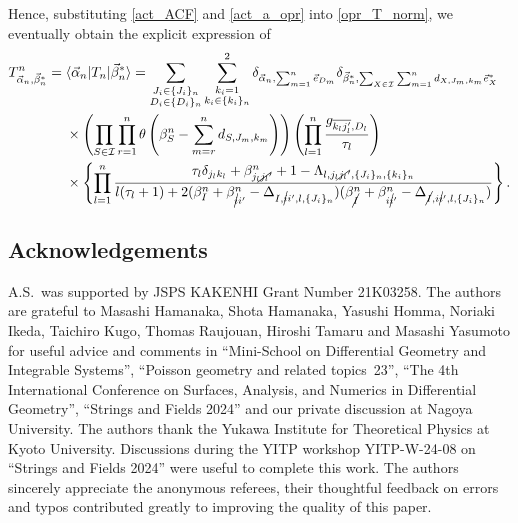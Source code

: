\documentclass[pdftex]{sigma}
\numberwithin{equation}{section}
\begin{document}
Hence, substituting \eqref{act_ACF} and \eqref{act_a_opr} into \eqref{opr_T_norm}, we eventually obtain the explicit expression of~
\begin{align*}%
 T^{n}_{\vec{\alpha}_{n},\vec{\beta}_{n}^{\ast}}
 ={}&
\langle
 \vec{\alpha}_{n}
|
 T_{n}
|
 \vec{\beta}_{n}^{\ast}
\rangle
 =
 \sum_{
 \substack{
 J_{i}
 \in
 \{J_{i}\}_{n}
 \\
 D_{i}
 \in
 \{D_{i}\}_{n}
 }
 }
 \sum_{
 \substack{
 k_{i}
 =
 1
 \\
 k_{i}
 \in
 \{k_{i}\}_{n}
 }
 }^{2}
 \delta_{
 \vec{\alpha}_{n},
 \sum_{m=1}^{n}
 \vec{e}_{D_{m}}
 }
 \delta_{
 \vec{\beta}_{n}^{\ast},
 \sum_{
 X
 \in
 \mathcal{I}
 }
 \sum_{m=1}^{n}
 d_{
 X,
 J_{m},
 k_{m}
 }
 \vec{e}_{X}^{\ast}
 }
 \nonumber
 \\
 &
 \times
 \left(
 \prod_{
 S
 \in
 \mathcal{I}
 }
 \prod_{r=1}^{n}
 \theta
 \left(
 \beta_{S}^{n}
 -
 \sum_{m=r}^{n}
 d_{
 S,
 J_{m},
 k_{m}
 }
 \right)
 \right)
 \left(
 \prod_{l=1}^{n}
 \frac{g_{\overline{k_{l}j_{l}'},D_{l}}}{\tau_{l}}
 \right)
 \\
 &
 \times
 \left\{
 \prod_{l=1}^{n}
 \frac{
 \tau_{l}
 \delta_{j_{l}k_{l}}
 +
 \beta_{j_{l}\cancel{j_{l}}'}^{n}
 +
 1
 -
 \Lambda_{
 l,
 j_{l}\cancel{j_{l}}',
 \{
 J_{i}
 \}_{n},
 \{
 k_{i}
 \}_{n}
 }
 }{
 l
 (
 \tau_{l}+1
 )
 +
 2
 (
 \beta_{I}^{n}
 +
 \beta_{\cancel{i}i'}^{n}
 -
 \Delta_{
 I,
 \cancel{i}i',
 l,
 \{
 J_{i}
 \}_{n}
 }
 )
 (
 \beta_{\cancel{I}}^{n}
 +
 \beta_{i\cancel{i}'}^{n}
 -
 \Delta_{
 \cancel{I},
 i\cancel{i}',
 l,
 \{
 J_{i}
 \}_{n}
 }
 )
 }
 \right\}
 .
\end{align*}

\subsection*{Acknowledgements}

A.S.\ was supported by JSPS KAKENHI Grant Number 21K03258. The authors are grateful to Masashi Hamanaka, Shota Hamanaka, Yasushi Homma, Noriaki Ikeda, Taichiro Kugo, Thomas Raujouan, Hiroshi Tamaru and Masashi Yasumoto for useful advice and comments in ``Mini-School on Differential Geometry and Integrable Systems'', ``Poisson geometry and related topics~23'', ``The 4th International Conference on Surfaces, Analysis, and Numerics in Differential Geometry'', ``Strings and Fields 2024'' and our private discussion at Nagoya University. The authors thank the Yukawa Institute for Theoretical Physics at Kyoto University. Discussions during the YITP workshop YITP-W-24-08 on ``Strings and Fields 2024'' were useful to complete this work. The authors sincerely appreciate the anonymous referees, their thoughtful feedback on errors and typos contributed greatly to improving the quality of this paper.
\end{document}
